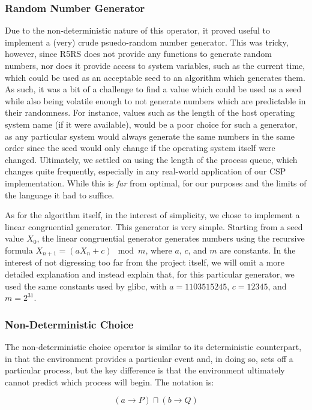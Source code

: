 \documentclass{article}
\begin{document}
\subsubsection*{Random Number Generator}
Due to the non-deterministic nature of this operator, it proved useful to implement a (very) crude psuedo-random number generator. This was tricky, however, since R5RS 
does not provide any functions to generate random numbers, nor does it provide access to system variables, such as the current time, which could be used as an
acceptable seed to an algorithm which generates them. As such, it was a bit of a challenge to find a value which could be used as a seed while also being volatile
enough to not generate numbers which are predictable in their randomness. For instance, values such as the length of the host operating system name (if it were available), would be a poor choice for such a generator, as any particular system would always generate the same numbers in the same order since the seed would only
change if the operating system itself were changed. Ultimately, we settled on using the length of the process queue, which changes quite frequently, especially in
any real-world application of our CSP implementation. While this is \textit{far} from optimal, for our purposes and the limits of the language it had to suffice.

As for the algorithm itself, in the interest of simplicity, we chose to implement a linear congruential generator. This generator is very simple. Starting from
a seed value $X_0$, the linear congruential generator generates numbers using the recursive formula $X_{n+1} = (aX_n + c) \mod m$, where $a$, $c$, and $m$ are constants.
In the interest of not digressing too far from the project itself, we will omit a more detailed explanation and instead explain that, for this particular generator,
we used the same constants used by glibc, with $a = 1103515245$, $c = 12345$, and $m = 2^{31}$.

\subsubsection*{Non-Deterministic Choice}
The non-deterministic choice operator is similar to its deterministic counterpart, in that the environment provides a particular event and,
in doing so, sets off a particular process, but the key difference
is that the environment ultimately cannot predict which process will begin. The notation is:

\[ (a \rightarrow P) \sqcap (b \rightarrow Q) \]
\end{document}
